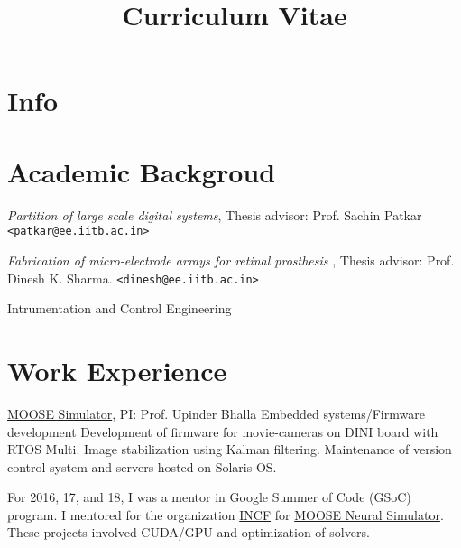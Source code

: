 \documentclass[11pt,a4paper, colorlinks=true, linkcolor=cyan]{moderncv}
\title{Curriculum Vitae}
\begin{document}
\maketitle

\vspace{0mm}

\section{Info}

\vspace{0mm}


\section{Academic Backgroud}

{\emph{Partition of large scale digital systems}, Thesis advisor: Prof. Sachin
Patkar \texttt{<patkar@ee.iitb.ac.in>}
}

{\emph{Fabrication of micro-electrode arrays for retinal prosthesis}
, Thesis advisor: Prof. Dinesh K. Sharma. \texttt{<dinesh@ee.iitb.ac.in>}}

  {Intrumentation and Control Engineering }


\section{Work Experience}
{}{}{
    \href{https://github.com/BhallaLab/moose}{MOOSE Simulator}, PI: Prof. Upinder Bhalla
}
{}{}{Embedded systems/Firmware development
Development of firmware for movie-cameras on DINI board with RTOS Multi. Image
stabilization using Kalman filtering. Maintenance of version control system and
servers hosted on Solaris OS.}

{}{}{For 2016, 17, and 18, I was a mentor in Google Summer of Code (GSoC)
    program. I mentored for the organization \href{https://incf.org}{INCF} for
    \href{https://moose.ncbs.res.in}{MOOSE Neural Simulator}. These projects
    involved CUDA/GPU and optimization of solvers.
}
\end{document}
